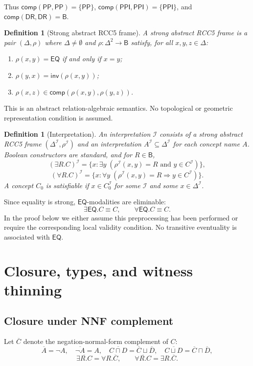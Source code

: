 \documentclass[11pt]{article}
\newtheorem{definition}[theorem]{Definition}
\newcommand{\Base}{\mathsf{B}}
\newcommand{\EQ}{\mathsf{EQ}}
\newcommand{\DR}{\mathsf{DR}}
\newcommand{\PP}{\mathsf{PP}}
\newcommand{\PPI}{\mathsf{PPI}}
\newcommand{\Inv}{\mathsf{inv}}
\newcommand{\comp}{\mathsf{comp}}
\newcommand{\I}{\mathcal I}
\begin{document}
Thus $\comp(\PP,\PP)=\{\PP\}$, $\comp(\PPI,\PPI)=\{\PPI\}$, and $\comp(\DR,\DR)=\Base$.

\begin{definition}[Strong abstract RCC5 frame]
A strong abstract RCC5 frame is a pair $(\Delta,\rho)$ where $\Delta\ne\emptyset$ and $\rho:\Delta^2\to\Base$ satisfy, for all $x,y,z\in\Delta$:
\begin{enumerate}[label=(F\arabic*)]
\item $\rho(x,y)=\EQ$ if and only if $x=y$;
\item $\rho(y,x)=\Inv(\rho(x,y))$;
\item $\rho(x,z)\in\comp(\rho(x,y),\rho(y,z))$.
\end{enumerate}
\end{definition}

This is an abstract relation-algebraic semantics.  No topological or geometric representation condition is assumed.

\begin{definition}[Interpretation]
An interpretation $\I$ consists of a strong abstract RCC5 frame $(\Delta^\I,\rho^\I)$ and an interpretation $A^\I\subseteq\Delta^\I$ for each concept name $A$.  Boolean constructors are standard, and for $R\in\Base$,
\[
  (\exists R.C)^\I=\{x: \exists y\; (\rho^\I(x,y)=R \text{ and } y\in C^\I)\},
\]
\[
  (\forall R.C)^\I=\{x: \forall y\; (\rho^\I(x,y)=R \Rightarrow y\in C^\I)\}.
\]
A concept $C_0$ is satisfiable if $x\in C_0^\I$ for some $\I$ and some $x\in\Delta^\I$.
\end{definition}

Since equality is strong, $\EQ$-modalities are eliminable:
\[
   \exists\EQ.C \equiv C,\qquad \forall\EQ.C \equiv C.
\]
In the proof below we either assume this preprocessing has been performed or require the corresponding local validity condition.  No transitive eventuality is associated with $\EQ$.

\section{Closure, types, and witness thinning}

\subsection{Closure under NNF complement}

Let $\overline C$ denote the negation-normal-form complement of $C$:
\[
\overline A=\neg A,
\quad \overline{\neg A}=A,
\quad
\overline{C\sqcap D}=\overline C\sqcup\overline D,
\quad
\overline{C\sqcup D}=\overline C\sqcap\overline D,
\]
\[
\overline{\exists R.C}=\forall R.\overline C,
\qquad
\overline{\forall R.C}=\exists R.\overline C.
\]
\end{document}
